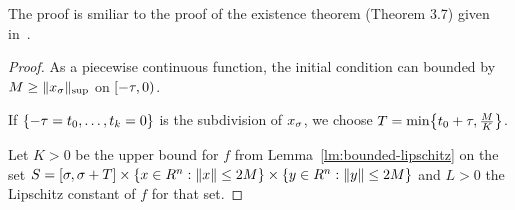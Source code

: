     The proof is smiliar to the proof of the existence theorem (Theorem 3.7) given in~\cite{Smith10IntroDDE}.
    \begin{proof}
        As a piecewise continuous function, the initial condition can bounded by $M\geq \supnorm{x_\tzero}$ on $\delayinterval[\tau]$.
        
        If $\set{\range{-\tau=t_0}{t_k=0}}$ is the subdivision of $x_{\tzero}$, we choose $T=\min\set{t_0+\tau,\frac{M}{K}}$.
        
        Let $K>0$ be the upper bound for $f$ from Lemma~\ref{lm:bounded-lipschitz} on the set $S=[\tzero,\tzero+T] \times \{x\in R^n: \nnorm{x}\leq 2M\}\times \{y\in R^n: \nnorm{y}\leq 2M\}$ and $L>0$ the Lipschitz constant of $f$ for that set.


\end{proof}
